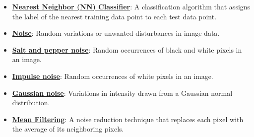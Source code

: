 \documentclass{article}%
\begin{document}
\begin{itemize}[leftmargin=*]
\item \href{https://purdue.brightspace.com/d2l/common/assets/pdfjs-d2l-dist/1.0.14-legacy/web/viewer.html?file=%2Fcontent%2Fenforced%2F1095467-wl.202510.CS.24300.001%2F07L2-Vision.pdf%3Fou%3D1095467&lang=en-us&container=d2l-fileviewer-rendered-pdf&fullscreen=d2l-fileviewer-rendered-pdf-dialog&height=667#page=30}{\textbf{Nearest Neighbor (NN) Classifier}}: A classification algorithm that assigns the label of the nearest training data point to each test data point.%
\item \href{https://purdue.brightspace.com/d2l/common/assets/pdfjs-d2l-dist/1.0.14-legacy/web/viewer.html?file=%2Fcontent%2Fenforced%2F1095467-wl.202510.CS.24300.001%2F07L2-Vision.pdf%3Fou%3D1095467&lang=en-us&container=d2l-fileviewer-rendered-pdf&fullscreen=d2l-fileviewer-rendered-pdf-dialog&height=667#page=33}{\textbf{Noise}}: Random variations or unwanted disturbances in image data.%
\item \href{https://purdue.brightspace.com/d2l/common/assets/pdfjs-d2l-dist/1.0.14-legacy/web/viewer.html?file=%2Fcontent%2Fenforced%2F1095467-wl.202510.CS.24300.001%2F07L2-Vision.pdf%3Fou%3D1095467&lang=en-us&container=d2l-fileviewer-rendered-pdf&fullscreen=d2l-fileviewer-rendered-pdf-dialog&height=667#page=36}{\textbf{Salt and pepper noise}}: Random occurrences of black and white pixels in an image.%
\item \href{https://purdue.brightspace.com/d2l/common/assets/pdfjs-d2l-dist/1.0.14-legacy/web/viewer.html?file=%2Fcontent%2Fenforced%2F1095467-wl.202510.CS.24300.001%2F07L2-Vision.pdf%3Fou%3D1095467&lang=en-us&container=d2l-fileviewer-rendered-pdf&fullscreen=d2l-fileviewer-rendered-pdf-dialog&height=667#page=36}{\textbf{Impulse noise}}: Random occurrences of white pixels in an image.%
\item \href{https://purdue.brightspace.com/d2l/common/assets/pdfjs-d2l-dist/1.0.14-legacy/web/viewer.html?file=%2Fcontent%2Fenforced%2F1095467-wl.202510.CS.24300.001%2F07L2-Vision.pdf%3Fou%3D1095467&lang=en-us&container=d2l-fileviewer-rendered-pdf&fullscreen=d2l-fileviewer-rendered-pdf-dialog&height=667#page=36}{\textbf{Gaussian noise}}: Variations in intensity drawn from a Gaussian normal distribution.%
\item \href{https://purdue.brightspace.com/d2l/common/assets/pdfjs-d2l-dist/1.0.14-legacy/web/viewer.html?file=%2Fcontent%2Fenforced%2F1095467-wl.202510.CS.24300.001%2F07L2-Vision.pdf%3Fou%3D1095467&lang=en-us&container=d2l-fileviewer-rendered-pdf&fullscreen=d2l-fileviewer-rendered-pdf-dialog&height=667#page=38}{\textbf{Mean Filtering}}: A noise reduction technique that replaces each pixel with the average of its neighboring pixels.%

\end{itemize}
\end{document}

